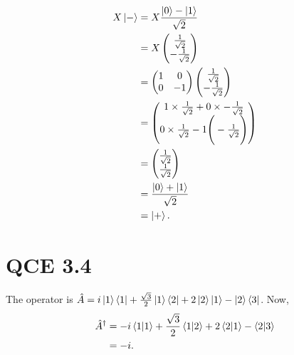 \documentclass[10pt]{article}
\begin{document}
\begin{align*}
X \ket{-} &= X \frac{\ket{0} - \ket{1}}{\sqrt{2}} \\
               &= X \begin{pmatrix}
               \frac{1}{\sqrt{2}} \\
               - \frac{1}{\sqrt{2}}
               \end{pmatrix} \\
               &= \begin{pmatrix}
               1 & 0 \\
               0 & - 1 
               \end{pmatrix} \begin{pmatrix}
               \frac{1}{\sqrt{2}} \\
               - \frac{1}{\sqrt{2}}
               \end{pmatrix} \\
               & = \begin{pmatrix}
               1 \times \frac{1}{\sqrt{2}} + 0 \times -\frac{1}{\sqrt{2}} \\
               0 \times \frac{1}{\sqrt{2}} - 1 \Bigg(-\frac{1}{\sqrt{2}} \Bigg)
               \end{pmatrix} \\
                &= \begin{pmatrix}
               \frac{1}{\sqrt{2}} \\
               \frac{1}{\sqrt{2}}
               \end{pmatrix} \\
               &= \frac{\ket{0} + \ket{1}}{\sqrt{2}} \\
               &= \ket{+}.
\end{align*}

\section*{QCE 3.4} 
The operator is $\hat{A} = i \ket{1} \bra{1} + \frac{\sqrt{3}}{2} \ket{1} \bra{2} + 2 \ket{2} \ket{1} - \ket{2} \bra{3}$. Now, 
\begin{align*}
\hat{A}^{\dag} &= -i \braket{1 | 1} + \frac{\sqrt{3}}{2} \braket{ 1 | 2 } + 2 \braket{2 | 1} - \braket{2 | 3} \\
                       &= -i.
\end{align*}
\end{document}
